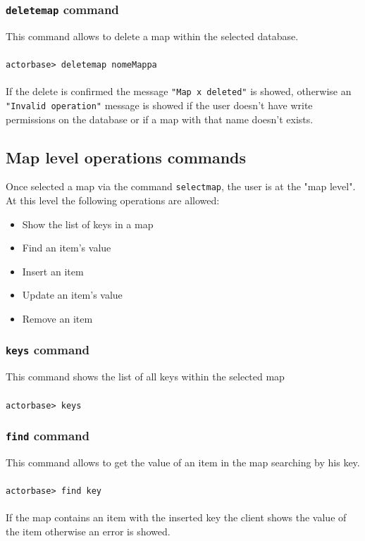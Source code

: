 \documentclass[a4paper]{article}
\begin{document}
	\subsubsection{\texttt{deletemap} command}
	This command allows to delete  a map within the selected database.
	\\ \\
	\texttt{actorbase>	deletemap nomeMappa}
	\\ \\
	If the delete is confirmed the message \texttt{"Map x deleted"} is showed, otherwise an \texttt{"Invalid operation"} message is showed if the user doesn't have write permissions on the database or if a map with that name doesn't exists.
	

	\subsection{Map level operations commands}
	Once selected a map via the command \texttt{selectmap}, the user is at the "map level". At this level the following operations are allowed:
	\begin{itemize}
		\item Show the list of keys in a map
		\item Find an item's value
		\item Insert an item
		\item Update an item's value
		\item Remove an item
	\end{itemize}

	\subsubsection{\texttt{keys} command}
	This command shows the list of all keys within the selected map
	\\ \\
	\texttt{actorbase>	keys}

	\subsubsection{\texttt{find} command}
	This command allows to get the value of an item in the map searching by his key.
	\\ \\
	\texttt{actorbase>	find key}
	\\ \\
	If the map contains an item with the inserted key the client shows the value of the item otherwise an error is showed.
\end{document}
